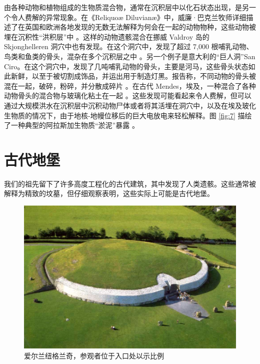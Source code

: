 \documentclass[10pt,twocolumn,letterpaper]{article}
\begin{document}
由各种动物和植物组成的生物质混合物，通常在沉积层中以化石状态出现，是另一个令人费解的异常现象。在《Reliquoæ Diluvianæ》中，威廉·巴克兰牧师详细描述了在英国和欧洲各地发现的无数无法解释为何会在一起的动物物种，这些动物被埋在沉积性“洪积层”中 \cite{58}。这样的动物遗骸混合在挪威 Valdroy 岛的 Skjonghelleren 洞穴中也有发现。在这个洞穴中，发现了超过 7,000 根哺乳动物、鸟类和鱼类的骨头，混杂在多个沉积层之中 \cite{59}。另一个例子是意大利的“巨人洞”San Ciro。在这个洞穴中，发现了几吨哺乳动物的骨头，主要是河马，这些骨头状态如此新鲜，以至于被切割成饰品，并运出用于制造灯黑。报告称，不同动物的骨头被混在一起，破碎，粉碎，并分散成碎片 \cite{60,61}。在古代 Mendes，埃及，一种混合了各种动物骨头的混合物与玻璃化粘土在一起 \cite{57}。这些发现可能看起来令人费解，但可以通过大规模洪水在沉积层中沉积动物尸体或者将其活埋在洞穴中，以及在埃及玻化生物质的情况下，由于地核-地幔位移后的巨大电放电来轻松解释。图 \ref{fig:7} 描绘了一种典型的阿拉斯加生物质“淤泥”暴露 \cite{56}。

\section{古代地堡}
我们的祖先留下了许多高度工程化的古代建筑，其中发现了人类遗骸。这些通常被解释为精致的坟墓，但仔细观察表明，这些实际上可能是古代地堡。

\begin{figure}[b]
\begin{center}
   \includegraphics[width=1\linewidth]{ww19.jpg}
\end{center}
   \caption{爱尔兰纽格兰奇，参观者位于入口处以示比例}
\label{fig:8}
\label{fig:onecol}
\end{figure}
\end{document}
